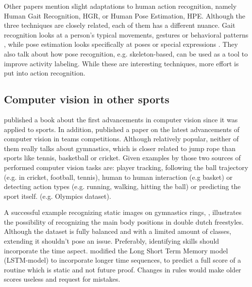 Other papers mention slight adaptations to human action recognition, namely Human Gait Recognition, HGR, or Human Pose Estimation, HPE. Although the three techniques are closely related, each of them has a different nuance. Gait recognition looks at a person's typical movements, gestures or behavioral patterns \autocite{Alharthi_2019}, while pose estimation looks specifically at poses or special expressions \autocite{Song_2021}. They also talk about how pose recognition, e.g. skeleton-based, can be used as a tool to improve activity labeling.
While these are interesting techniques, more effort is put into action recognition.





\subsection{Computer vision in other sports}
\label{subsubsec:bp-literature-computer-vision-sports}

\textcite{Soomro_2014} published a book about the first advancements in computer vision since it was applied to sports. In addition, \textcite{Yin_2024} published a paper on the latest advancements of computer vision in teams competitions. Although relatively popular, neither of them really talks about gymnastics, which is closer related to jump rope than sports like tennis, basketball or cricket.
Given examples by those two sources of performed computer vision tasks are: player tracking, following the ball trajectory (e.g. in cricket, football, tennis), human to human interaction (e.g basket) or detecting action types (e.g. running, walking, hitting the ball) or predicting the sport itself. (e.g. Olympics dataset).

A successful example recognizing static images on gymnastics rings, \textcite{Abdullah_2023}, illustrates the possibility of recognizing the main body positions in double dutch freestyles. Although the dataset is fully balanced and with a limited amount of classes, extending it shouldn't pose an issue. Preferably, identifying skills should incorporate the time aspect.
\textcite{Zahan_2023} modified the Long Short Term Memory model (LSTM-model) to incorporate longer time sequences, to predict a full score of a routine which is static and not future proof. Changes in rules would make older scores useless and request for mistakes.

